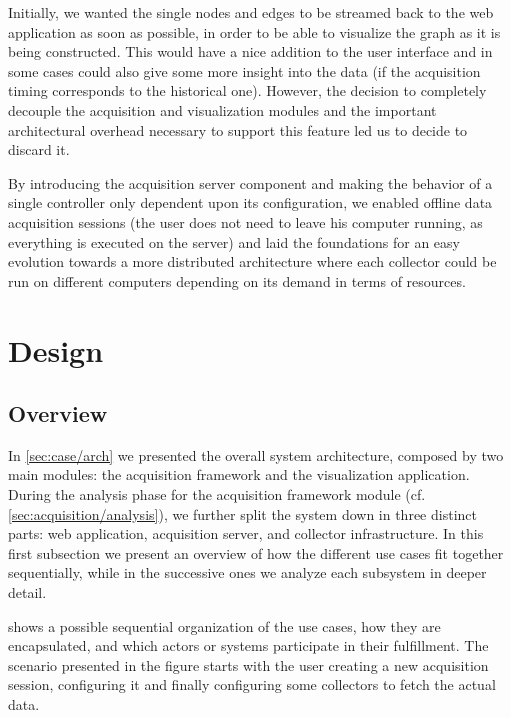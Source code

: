 Initially, we wanted the single nodes and edges to be streamed back to the web application as soon as possible, in order to be able to visualize the graph as it is being constructed. This would have a nice addition to the user interface and in some cases could also give some more insight into the data (if the acquisition timing corresponds to the historical one). However, the decision to completely decouple the acquisition and visualization modules and the important architectural overhead necessary to support this feature led us to decide to discard it.

By introducing the acquisition server component and making the behavior of a single controller only dependent upon its configuration, we enabled offline data acquisition sessions (the user does not need to leave his computer running, as everything is executed on the server) and laid the foundations for an easy evolution towards a more distributed architecture where each collector could be run on different computers depending on its demand in terms of resources.


\section{Design}


\subsection{Overview}

In \vref{sec:case/arch} we presented the overall system architecture, composed by two main modules: the acquisition framework and the visualization application. During the analysis phase for the acquisition framework module (cf. \ref{sec:acquisition/analysis}), we further split the system down in three distinct parts: web application, acquisition server, and collector infrastructure. In this first subsection we present an overview of how the different use cases fit together sequentially, while in the successive ones we analyze each subsystem in deeper detail.

 shows a possible sequential organization of the use cases, how they are encapsulated, and which actors or systems participate in their fulfillment. The scenario presented in the figure starts with the user creating a new acquisition session, configuring it and finally configuring some collectors to fetch the actual data.

